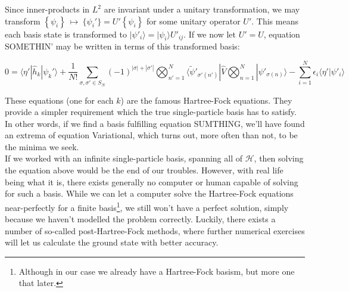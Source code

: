 \documentclass[10pt]{report}
\begin{document}
	Since inner-products in $L^2$ are invariant under a unitary transformation, we may transform $\left\{\psi_i\right\} \:\mapsto\: \{\psi_i'\} = U'\left\{\psi_i\right\}$ for some unitary operator $U'$. This means each basis state is transformed to $|\psi'_i\rangle = |\psi_i\rangle U'_{ij}$. If we now let $U'=U$, equation SOMETHIN' may be written in terms of this transformed basis:
	
	\begin{equation}
		0 = \langle\eta'|\hat{h}_k|\psi_k'\rangle + \frac{1}{N!}\sum_{\sigma,\sigma'\in S_N} (-1)^{|\sigma|+|\sigma'|}\bigotimes_{n'=1}^N \langle\widetilde{\psi}'_{\sigma'(n')}|\hat{V}\bigotimes_{n=1}^N |\psi'_{\sigma(n)}\rangle
		- \sum_{i=1}^N \epsilon_i\langle\eta'|\psi'_i\rangle
	\end{equation}
	
	These equations (one for each $k$) are the famous Hartree-Fock equations. They provide a simpler requirement which the true single-particle basis has to satisfy. 
	In other words, if we find a basis fulfilling equation SUMTHING, we'll have found an extrema of equation Variational, which turns out, more often than not, to be the minima we seek.\\
	
	If we worked with an infinite single-particle basis, spanning all of $\mathcal{H}$, then solving the equation above would be the end of our troubles. However, with real life being what it is, there exists generally no computer or human capable of solving for such a basis. While we can let a computer solve the Hartree-Fock equations near-perfectly for a finite basis\footnote{Although in our case we already have a Hartree-Fock basism, but more one that later.}, we still won't have a perfect solution, simply because we haven't modelled the problem correctly. Luckily, there exists a number of so-called post-Hartree-Fock methods, where further numerical exercises will let us calculate the ground state with better accuracy.
	
\end{document}

